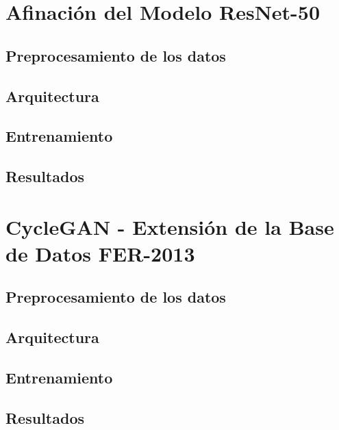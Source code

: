 \section{Afinación del Modelo ResNet-50}
\cite{ResNet}

\subsection{Preprocesamiento de los datos}

\subsection{Arquitectura}

\subsection{Entrenamiento}

\subsection{Resultados}




\section{CycleGAN - Extensión de la Base de Datos FER-2013}

\subsection{Preprocesamiento de los datos}

\subsection{Arquitectura}

\subsection{Entrenamiento}

\subsection{Resultados}